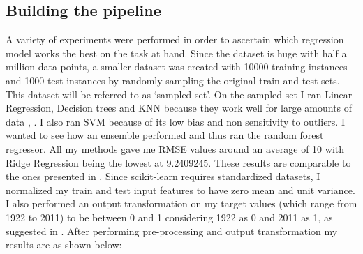 \documentclass{article} %
\begin{document}
\subsection{Building the pipeline}
A variety of experiments were performed in order to ascertain which regression model works the best on the task at hand. Since the dataset is huge with half a million data points, a smaller dataset was created with 10000 training instances and 1000 test instances by randomly sampling the original train and test sets. This dataset will be referred to as `sampled set'. On the sampled set I ran Linear Regression, Decision trees and KNN because they work well for large amounts of data \cite{wiki_tree}, \cite{msd_11}. I also ran SVM because of its low bias and non sensitivity to outliers. I wanted to see how an ensemble performed and thus ran the random forest regressor. All my methods gave me RMSE values around an average of 10 with Ridge Regression being the lowest at 9.2409245. These results are comparable to the ones presented in \cite{msd_11}. Since scikit-learn requires standardized datasets\cite{sklearn_scale}, I normalized my train and test input features to have zero mean and unit variance. I also performed an output transformation on my target values (which range from 1922 to 2011) to be between 0 and 1 considering 1922 as 0 and 2011 as 1, as suggested in \cite{msd_11}. After performing pre-processing and output transformation my results are as shown below:

\end{document}
